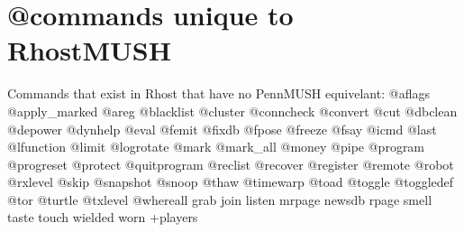 \documentclass[letterpaper,10pt,english]{sphinxmanual}
\begin{document}
\section{@commands unique to RhostMUSH}
\label{\detokenize{31-comparison:commands-unique-to-rhostmush}}
\sphinxAtStartPar
Commands that exist in Rhost that have no PennMUSH equivelant:
@aflags                      @apply\_marked                 @areg
@blacklist                   @cluster                      @conncheck
@convert                     @cut                          @dbclean
@depower                     @dynhelp                      @eval
@femit                       @fixdb                        @fpose
@freeze                      @fsay                         @icmd
@last                        @lfunction                    @limit
@logrotate                   @mark                         @mark\_all
@money                       @pipe                         @program
@progreset                   @protect                      @quitprogram
@reclist                     @recover                      @register
@remote                      @robot                        @rxlevel
@skip                        @snapshot                     @snoop
@thaw                        @timewarp                     @toad
@toggle                      @toggledef                    @tor
@turtle                      @txlevel                      @whereall
grab                         join                          listen
mrpage                       newsdb                        rpage
smell                        taste                         touch
wielded                      worn                          +players
\end{document}
